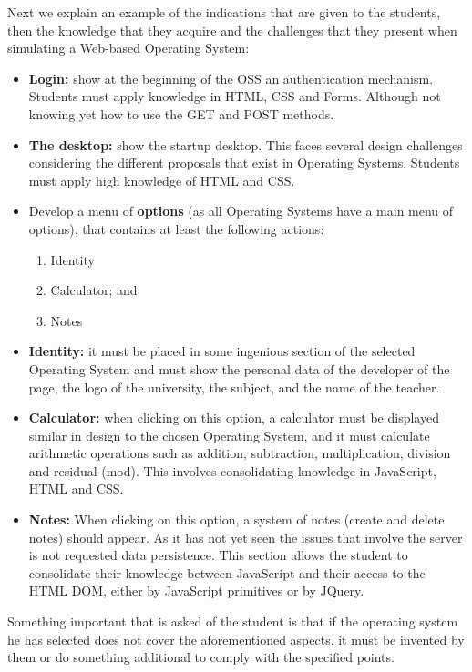 Next we explain an example of the indications that are given to the students, then
the knowledge that they acquire and the challenges that they present when 
simulating a Web-based Operating System:
\begin{itemize}
    \item \textbf{Login:} show at the beginning of the OSS an authentication mechanism. 
        Students must apply knowledge in HTML, CSS and Forms. Although not knowing yet
        how to use the GET and POST methods.
    \item \textbf{The desktop:} show the startup desktop. This faces several design 
        challenges considering 
        the different proposals that exist in Operating Systems. Students must apply 
        high knowledge of HTML and CSS.
    \item Develop a menu of \textbf{options} (as all Operating Systems have a main menu of 
        options), that contains at least the following actions:
        \begin{enumerate}
            \item Identity
            \item Calculator; and
            \item Notes
        \end{enumerate}
    \item \textbf{Identity:} it must be placed in some ingenious section of the selected 
        Operating System and must show the personal data of the developer of the page, 
        the logo of the university, the subject, and the name of the teacher.
    \item \textbf{Calculator:} when clicking on this option, a calculator must be displayed
        similar in design to the chosen Operating System, and it must calculate arithmetic 
        operations such as addition, subtraction, multiplication, division and residual (mod). 
        This involves consolidating knowledge in JavaScript, HTML and CSS.
    \item \textbf{Notes:} When clicking on this option, a system of notes (create and delete 
        notes) should appear. As it has not yet seen the issues that involve the server is 
        not requested data persistence. This section allows the student to consolidate their 
        knowledge between JavaScript and their access to the HTML DOM, either by JavaScript 
        primitives or by JQuery.
\end{itemize}

Something important that is asked of the student is that if the operating system he has selected 
does not cover the aforementioned aspects, it must be invented by them or do something additional 
to comply with the specified points.

